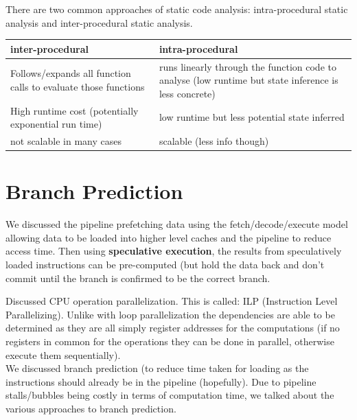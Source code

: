 \documentclass[twoside]{article}
\begin{document}
There are two common approaches of static code analysis: intra-procedural static analysis and inter-procedural static analysis.
\begin{table}[h!]
\begin{tabular}{|p{8cm}|p{8cm}|}
\hline
\textbf{inter-procedural} & \textbf{intra-procedural} \\ \hline
Follows/expands all function calls to evaluate those functions  & runs linearly through the function code to analyse (low runtime but state inference is less concrete)   \\ \hline
High runtime cost (potentially exponential run time) & low runtime but less potential state  inferred \\\hline
not scalable in many cases & scalable (less info though)\\\hline
\end{tabular}
\end{table}

    
\section{Branch Prediction}
We discussed the pipeline prefetching data using the fetch/decode/execute model allowing data to be loaded into higher level caches and the pipeline to reduce access time.
Then using \textbf{speculative execution}, the results from speculatively loaded instructions can be pre-computed (but hold the data back and don't commit until the branch is confirmed to be the correct branch.

Discussed CPU operation parallelization. This is called: ILP (Instruction Level Parallelizing). Unlike with loop parallelization the dependencies are able to be determined as they are all simply register addresses for the computations (if no registers in common for the operations they can be done in parallel, otherwise execute them sequentially).\\

We discussed branch prediction (to reduce time taken for loading as the instructions should already be in the pipeline (hopefully). Due to pipeline stalls/bubbles being costly in terms of computation time, we talked about the various approaches to branch prediction.\\
\end{document}
